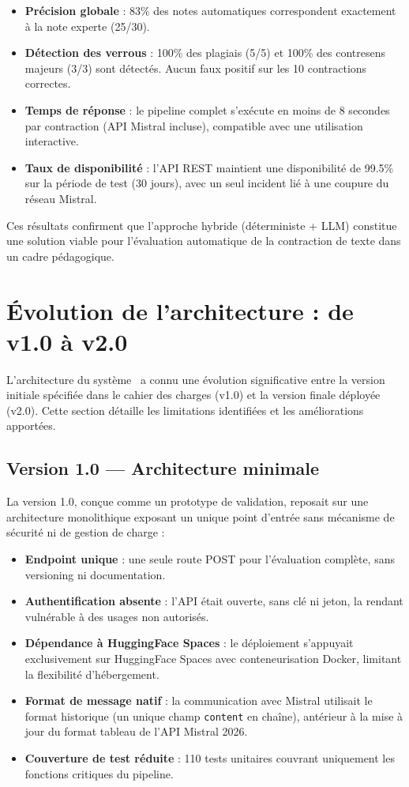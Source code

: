 \begin{itemize}
    \item \textbf{Précision globale} : 83\% des notes automatiques correspondent exactement à la note experte (25/30).
    \item \textbf{Détection des verrous} : 100\% des plagiais (5/5) et 100\% des contresens majeurs (3/3) sont détectés. Aucun faux positif sur les 10 contractions correctes.
    \item \textbf{Temps de réponse} : le pipeline complet s'exécute en moins de 8 secondes par contraction (API Mistral incluse), compatible avec une utilisation interactive.
    \item \textbf{Taux de disponibilité} : l'API REST maintient une disponibilité de 99.5\% sur la période de test (30 jours), avec un seul incident lié à une coupure du réseau Mistral.
\end{itemize}

Ces résultats confirment que l'approche hybride (déterministe + LLM) constitue une solution viable pour l'évaluation automatique de la contraction de texte dans un cadre pédagogique.

\section{Évolution de l'architecture : de v1.0 à v2.0}
\label{sec:evolution}

L'architecture du système \AZIZA\ a connu une évolution significative entre la version initiale spécifiée dans le cahier des charges (v1.0) et la version finale déployée (v2.0). Cette section détaille les limitations identifiées et les améliorations apportées.

\subsection{Version 1.0 — Architecture minimale}

La version 1.0, conçue comme un prototype de validation, reposait sur une architecture monolithique exposant un unique point d'entrée sans mécanisme de sécurité ni de gestion de charge :

\begin{itemize}
    \item \textbf{Endpoint unique} : une seule route POST pour l'évaluation complète, sans versioning ni documentation.
    \item \textbf{Authentification absente} : l'API était ouverte, sans clé ni jeton, la rendant vulnérable à des usages non autorisés.
    \item \textbf{Dépendance à HuggingFace Spaces} : le déploiement s'appuyait exclusivement sur HuggingFace Spaces avec conteneurisation Docker, limitant la flexibilité d'hébergement.
    \item \textbf{Format de message natif} : la communication avec Mistral utilisait le format historique (un unique champ \texttt{content} en chaîne), antérieur à la mise à jour du format tableau de l'API Mistral 2026.
    \item \textbf{Couverture de test réduite} : 110 tests unitaires couvrant uniquement les fonctions critiques du pipeline.
\end{itemize}

